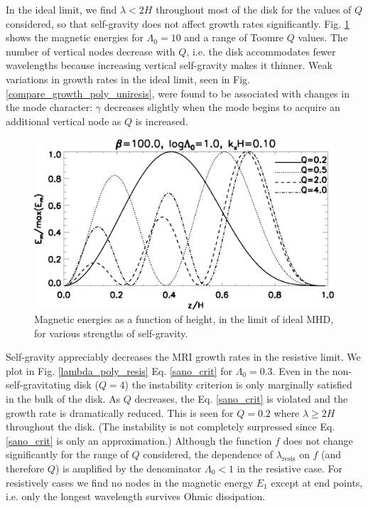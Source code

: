 In the ideal limit, we find $\lambda < 2H$ throughout most of the disk
for the values of $Q$ considered, so that self-gravity does not affect
growth rates significantly. Fig. \ref{compare_result_lambda10} shows
the magnetic energies for $\Lambda_0=10$ and a range of Toomre $Q$
values. The number of vertical nodes decrease with $Q$, 
i.e. the disk accommodates fewer wavelengths because increasing
vertical self-gravity makes it thinner. 
Weak variations in growth rates in the ideal limit, seen in 
Fig. \ref{compare_growth_poly_uniresis}, were found to be associated
with changes in the mode character: $\gamma$ decreases
slightly when the mode begins to acquire an additional vertical node as $Q$ is
increased. 

\begin{figure}
  \includegraphics[width=\linewidth]{figures/compare_result_lambda10}
  \caption{Magnetic energies as a function of height, in the limit of
    ideal MHD, for various strengths of self-gravity.   
    \label{compare_result_lambda10}}
\end{figure}

Self-gravity appreciably decreases the MRI growth rates in the
resistive limit. We plot in Fig. \ref{lambda_poly_resis}
Eq. \ref{sano_crit} for $\Lambda_0=0.3$. Even in the
non-self-gravitating disk ($Q=4$) the instability criterion is only
marginally satisfied in the bulk of the disk. As $Q$ decreases, the
Eq. \ref{sano_crit} is violated and the growth rate is dramatically
reduced. This is seen for $Q=0.2$ where $\lambda \geq 2H$ throughout
the disk. (The instability is not completely surpressed since
Eq. \ref{sano_crit} is only an approximation.) Although the function
$f$ does not change significantly for the range of $Q$ considered, the
dependence of $\lambda_\mathrm{resis}$ on $f$ (and therefore $Q$) is
amplified by the denominator $\Lambda_0<1$ in the resistive case. For resistively cases
we find no nodes in the magnetic energy $E_1$ except at end points,
i.e. only the longest wavelength survives Ohmic dissipation. 


